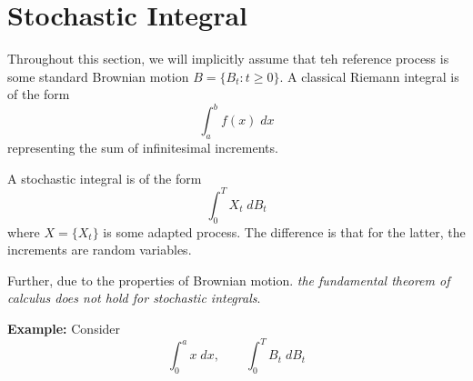 \documentclass[12pt]{report}
\newcommand*{\tbf}[1]{\ifmmode\mathbf{#1}\else\textbf{#1}\fi}
\begin{document}
\section{Stochastic Integral}
    Throughout this section, we will implicitly assume that teh reference process is some standard Brownian motion $B = \{B_t: t \geq 0\}$. A classical Riemann integral is of the form 
    \[\int_a^bf(x) \; dx\]
    representing the sum of infinitesimal increments. 
    
    A stochastic integral is of the form 
    \[\int_0^{T} X_t \; dB_t\]
    where $X = \{X_t\}$ is some adapted process. The difference is that for the latter, the increments are random variables. 

    Further, due to the properties of Brownian motion. \emph{the fundamental theorem of calculus does not hold for stochastic integrals}.

    \tbf{Example:} Consider 
    \[\int_0^a x\; dx, \qquad \int_0^T B_t \; dB_t\]
\end{document}
